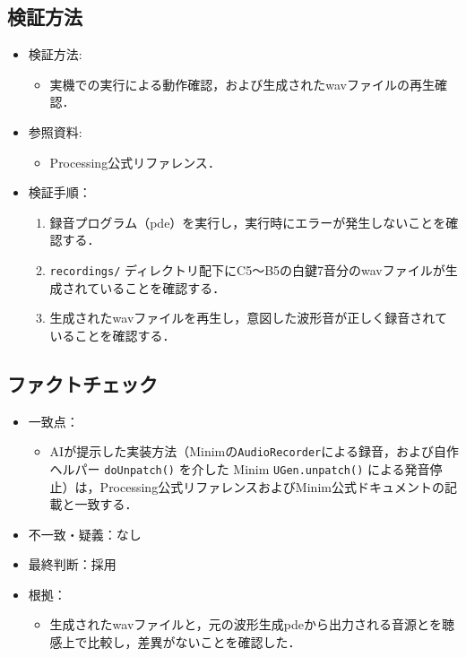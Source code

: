 \documentclass[lualatex,paper=a4paper,jafontsize=11.5pt,jafontscale=1.05]{jlreq}
\begin{document}
\subsection{検証方法}
\begin{itemize}
  \item 検証方法:
  \begin{itemize}
      \item 実機での実行による動作確認，および生成されたwavファイルの再生確認．
  \end{itemize}
  \item 参照資料:
  \begin{itemize}
      \item Processing公式リファレンス\cite{processing}．
  \end{itemize}
  \item 検証手順：
  \begin{enumerate}
      \item 録音プログラム（pde）を実行し，実行時にエラーが発生しないことを確認する．
      \item \texttt{recordings/} ディレクトリ配下にC5〜B5の白鍵7音分のwavファイルが生成されていることを確認する．
      \item 生成されたwavファイルを再生し，意図した波形音が正しく録音されていることを確認する．
  \end{enumerate}
\end{itemize}

\subsection{ファクトチェック}
\begin{itemize}
  \item 一致点：
  \begin{itemize}
    \item AIが提示した実装方法（Minimの\texttt{AudioRecorder}による録音，および自作ヘルパー \texttt{doUnpatch()} を介した Minim \texttt{UGen.unpatch()}\cite{minim_unpatch} による発音停止）は，Processing公式リファレンス\cite{processing}およびMinim公式ドキュメントの記載と一致する．
  \end{itemize}
  \item 不一致・疑義：なし
  \item 最終判断：採用
  \item 根拠：
  \begin{itemize}
    \item 生成されたwavファイルと，元の波形生成pdeから出力される音源とを聴感上で比較し，差異がないことを確認した．
  \end{itemize}
\end{itemize}
\end{document}
